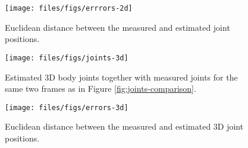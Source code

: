 \documentclass{article}
\begin{document}
\begin{figure}
    \centering
    \texttt{[image: files/figs/errrors-2d]}
    \caption{Euclidean distance between the measured and estimated joint positions.}
    \label{fig:errors-2d}
\end{figure}

\begin{figure}
  \centering
  \texttt{[image: files/figs/joints-3d]}
  \caption{Estimated 3D body joints together with measured joints for the same two frames as in Figure \ref{fig:joints-comparison}.}
  \label{fig:joints-comp3d}
\end{figure}

\begin{figure}
    \centering
    \texttt{[image: files/figs/errors-3d]}
    \caption{Euclidean distance between the measured and estimated 3D joint positions.}
    \label{fig:errors-3d}
\end{figure}



\newpage


\end{document}
